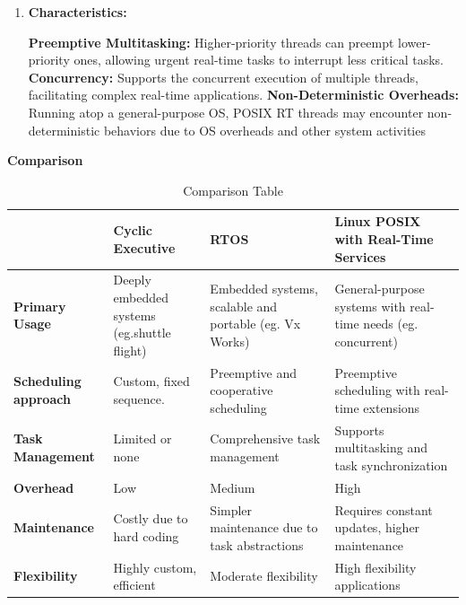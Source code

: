 \documentclass[a4paper,11pt]{article}%
\newenvironment{qanda}{\setlength{\parindent}{0pt}}{\bigskip}
\begin{document}
\begin{qanda}
\begin{enumerate}
\begin{enumerate}
					\item[]\textbf{Characteristics:}

					\textbf{Preemptive Multitasking:} Higher-priority threads can preempt lower-priority ones, allowing urgent real-time tasks to interrupt less critical tasks.
					\textbf{Concurrency:} Supports the concurrent execution of multiple threads, facilitating complex real-time applications.
					\textbf{Non-Deterministic Overheads:} Running atop a general-purpose OS, POSIX RT threads may encounter non-deterministic behaviors due to OS overheads and other system activities
			\end{enumerate}


			\textbf{Comparison}
			\begin{table}[H] %
				\centering
				\caption{Comparison Table}
				\label{table:multiline}
				\begin{tabular}{|l|p{4cm}|p{4cm}|p{4cm}|}
					\hline
					\textbf{}                    & \textbf{Cyclic Executive}                   & \textbf{RTOS}                                                   & \textbf{Linux POSIX with Real-Time Services}                           \\
					\hline
					\textbf{Primary Usage}       & Deeply embedded systems (eg.shuttle flight) & Embedded systems, scalable and portable (eg. Vx Works) & General-purpose systems with real-time needs (eg. concurrent) \\
					\hline
					\textbf{Scheduling approach} & Custom, fixed sequence.                     & Preemptive and cooperative scheduling                  & Preemptive scheduling with real-time extensions               \\
					\hline
					\textbf{Task Management}     & Limited or none                             & Comprehensive task management                          & Supports multitasking and task synchronization                \\
					\hline
					\textbf{Overhead}            & Low                                         & Medium                                                 & High                                                          \\
					\hline
					\textbf{Maintenance}         & Costly due to hard coding                   & Simpler maintenance due to task abstractions           & Requires constant updates, higher maintenance                 \\
					\hline
					\textbf{Flexibility}         & Highly custom, efficient                    & Moderate flexibility                                   & High flexibility applications                                 \\

\end{tabular}
\end{table}
\end{enumerate}
\end{qanda}
\end{document}
